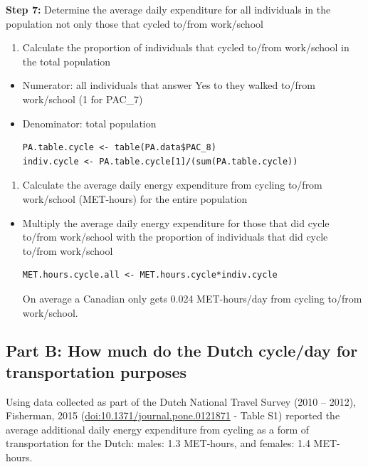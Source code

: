 \documentclass[]{book}
\providecommand{\tightlist}{%
  \setlength{\itemsep}{0pt}\setlength{\parskip}{0pt}}
\begin{document}
\textbf{Step 7:} Determine the average daily expenditure for all
individuals in the population not only those that cycled to/from
work/school

\begin{enumerate}
\def\labelenumi{\alph{enumi}.}
\tightlist
\item
  Calculate the proportion of individuals that cycled to/from
  work/school in the total population
\end{enumerate}

\begin{itemize}
\item
  Numerator: all individuals that answer Yes to they walked to/from
  work/school (1 for PAC\_7)
\item
  Denominator: total population

\begin{verbatim}
PA.table.cycle <- table(PA.data$PAC_8)
indiv.cycle <- PA.table.cycle[1]/(sum(PA.table.cycle))
\end{verbatim}
\end{itemize}

\begin{enumerate}
\def\labelenumi{\alph{enumi}.}
\setcounter{enumi}{1}
\tightlist
\item
  Calculate the average daily energy expenditure from cycling to/from
  work/school (MET-hours) for the entire population
\end{enumerate}

\begin{itemize}
\item
  Multiply the average daily energy expenditure for those that did cycle
  to/from work/school with the proportion of individuals that did cycle
  to/from work/school

\begin{verbatim}
MET.hours.cycle.all <- MET.hours.cycle*indiv.cycle
\end{verbatim}

  On average a Canadian only gets 0.024 MET-hours/day from cycling
  to/from work/school.
\end{itemize}

\subsection{Part B: How much do the Dutch cycle/day for transportation
purposes}\label{part-b-how-much-do-the-dutch-cycleday-for-transportation-purposes}

Using data collected as part of the Dutch National Travel Survey (2010
-- 2012), Fisherman, 2015 (\url{doi:10.1371/journal.pone.0121871} -
Table S1) reported the average additional daily energy expenditure from
cycling as a form of transportation for the Dutch: males: 1.3 MET-hours,
and females: 1.4 MET-hours.
\end{document}
